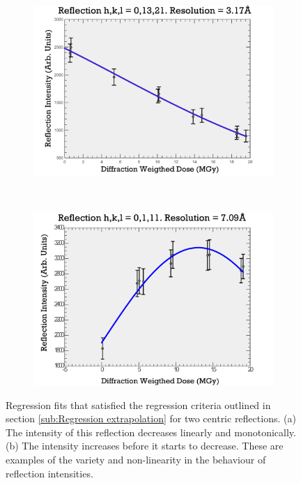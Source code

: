 \begin{figure}
        \centering
        \begin{subfigure}[b]{1\textwidth}
                \centering
                \includegraphics[width=\textwidth]{figures/zde/Reflection-0,13,21.pdf}
                \caption{}
                \label{fig:monotonic extrapolation}
        \end{subfigure}
				\\
        \begin{subfigure}[b]{1\textwidth}
                \centering
                \includegraphics[width=\textwidth]{figures/zde/Reflection-0,1,11.pdf}
                \caption{}
                \label{fig:Non-monotonic extrapolation}
        \end{subfigure}
        \caption{Regression fits that satisfied the regression criteria outlined in section \ref{sub:Regression extrapolation} for two centric reflections.
		(a) The intensity of this reflection decreases linearly and monotonically.
		(b) The intensity increases before it starts to decrease.
		These are examples of the variety and non-linearity in the behaviour of reflection intensities.}
        \label{fig:Successful zero-dose extrapolations}
\end{figure}

